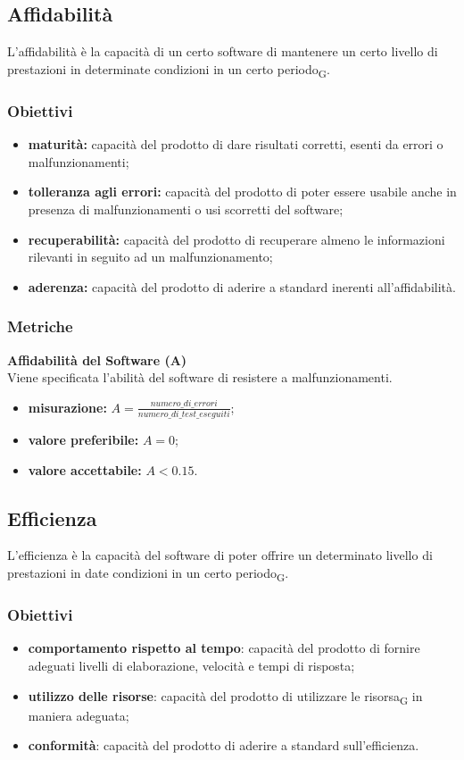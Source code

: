\subsection{Affidabilità}
L'affidabilità è la capacità di un certo software di mantenere un certo livello di prestazioni in determinate condizioni in un certo periodo\textsubscript{G}.
\subsubsection{Obiettivi}
\begin{itemize}
	\item \textbf{maturità:} capacità del prodotto di dare risultati corretti, esenti da errori o malfunzionamenti;
	\item \textbf{tolleranza agli errori:} capacità del prodotto di poter essere usabile anche in presenza di malfunzionamenti o usi scorretti del software;
	\item \textbf{recuperabilità:} capacità del prodotto di recuperare almeno le informazioni rilevanti in seguito ad un malfunzionamento;
	\item \textbf{aderenza:} capacità del prodotto di aderire a standard inerenti all'affidabilità.
\end{itemize}
\subsubsection{Metriche}
\textbf{Affidabilità del Software (A)}\\
Viene specificata l'abilità del software di resistere a malfunzionamenti.
\begin{itemize}
	\item \textbf{misurazione:} $A = \frac{numero\_di\_errori}{numero\_di\_test\_eseguiti}$;
	\item \textbf{valore preferibile:} $A = 0$;
	\item \textbf{valore accettabile:} $A < 0.15$.
\end{itemize}

\subsection{Efficienza}
L'efficienza è la capacità del software di poter offrire un determinato livello di prestazioni in date condizioni in un certo periodo\textsubscript{G}.
\subsubsection{Obiettivi}
\begin{itemize}
	\item \textbf{comportamento rispetto al tempo}: capacità del prodotto di fornire adeguati livelli di elaborazione, velocità e tempi di risposta;
	\item \textbf{utilizzo delle risorse}: capacità del prodotto di utilizzare le risorsa\textsubscript{G} in maniera adeguata;
	\item \textbf{conformità}: capacità del prodotto di aderire a standard sull'efficienza.
\end{itemize}
